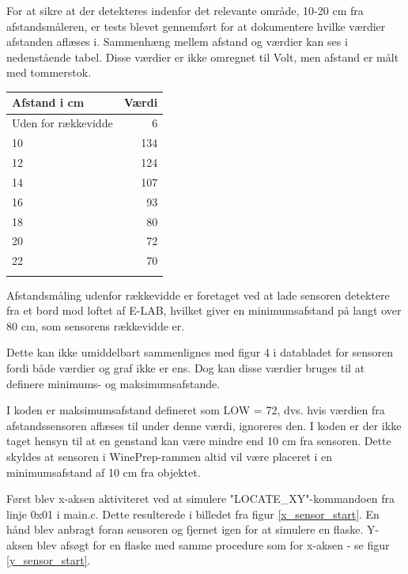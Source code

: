 For at sikre at der detekteres indenfor det relevante område, 10-20 cm fra afstandsmåleren, er tests blevet gennemført for at dokumentere hvilke værdier afstanden aflæses i. Sammenhæng mellem afstand og værdier kan ses i nedenstående tabel. Disse værdier er ikke omregnet til Volt, men afstand er målt med tommerstok.
\begin{table}[H]
\begin{tabular}{| l | r |}
	Afstand i cm & Værdi\\\hline
	Uden for rækkevidde & 6\\\hline
	10 & 134\\\hline
	12 & 124\\\hline
	14 & 107\\\hline
	16 & 93\\\hline
	18 & 80\\\hline
	20 & 72\\\hline
	22 & 70\\\hline
	\label{Afstand-vaerdier}
\end{tabular}
\end{table}

Afstandsmåling udenfor rækkevidde er foretaget ved at lade sensoren detektere fra et bord mod loftet af E-LAB, hvilket giver en minimumsafstand på langt over 80 cm, som sensorens rækkevidde er.

Dette kan ikke umiddelbart sammenlignes med figur 4 i databladet for sensoren fordi både værdier og graf ikke er ens. Dog kan disse værdier bruges til at definere minimums- og maksimumsafstande.

I koden er maksimumsafstand defineret som LOW = 72, dvs. hvis værdien fra afstandssensoren aflæses til under denne værdi, ignoreres den. I koden er der ikke taget hensyn til at en genstand kan være mindre end 10 cm fra sensoren. Dette skyldes at sensoren i WinePrep-rammen altid vil være placeret i en minimumsafstand af 10 cm fra objektet.

Først blev x-aksen aktiviteret ved at simulere "LOCATE_XY"-kommandoen fra linje 0x01 i main.c. Dette resulterede i billedet fra figur \ref{x_sensor_start}. En hånd blev anbragt foran sensoren og fjernet igen for at simulere en flaske. Y-aksen blev afsøgt for en flaske med samme procedure som for x-aksen - se figur \ref{y_sensor_start}.

